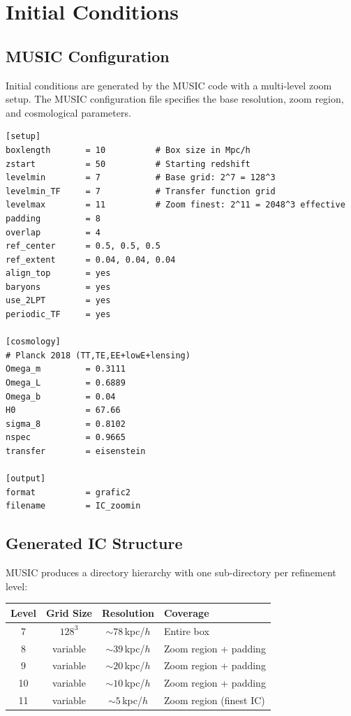 \documentclass[11pt,fleqn]{book}
\begin{document}
\section{Initial Conditions}

\subsection{MUSIC Configuration}

Initial conditions are generated by the MUSIC code with a multi-level zoom setup. The MUSIC configuration file specifies the base resolution, zoom region, and cosmological parameters.

\begin{codebox}
\begin{lstlisting}[style=bash,numbers=none]
[setup]
boxlength       = 10          # Box size in Mpc/h
zstart          = 50          # Starting redshift
levelmin        = 7           # Base grid: 2^7 = 128^3
levelmin_TF     = 7           # Transfer function grid
levelmax        = 11          # Zoom finest: 2^11 = 2048^3 effective
padding         = 8
overlap         = 4
ref_center      = 0.5, 0.5, 0.5
ref_extent      = 0.04, 0.04, 0.04
align_top       = yes
baryons         = yes
use_2LPT        = yes
periodic_TF     = yes

[cosmology]
# Planck 2018 (TT,TE,EE+lowE+lensing)
Omega_m         = 0.3111
Omega_L         = 0.6889
Omega_b         = 0.04
H0              = 67.66
sigma_8         = 0.8102
nspec           = 0.9665
transfer        = eisenstein

[output]
format          = grafic2
filename        = IC_zoomin
\end{lstlisting}
\end{codebox}

\subsection{Generated IC Structure}

MUSIC produces a directory hierarchy with one sub-directory per refinement level:

\begin{center}
\begin{tabular}{cccl}
\toprule
\textbf{Level} & \textbf{Grid Size} & \textbf{Resolution} & \textbf{Coverage} \\
\midrule
7 & $128^3$ & ${\sim}78$\,kpc/$h$ & Entire box \\
8 & variable & ${\sim}39$\,kpc/$h$ & Zoom region + padding \\
9 & variable & ${\sim}20$\,kpc/$h$ & Zoom region + padding \\
10 & variable & ${\sim}10$\,kpc/$h$ & Zoom region + padding \\
11 & variable & ${\sim}5$\,kpc/$h$ & Zoom region (finest IC) \\
\bottomrule
\end{tabular}
\end{center}
\end{document}
